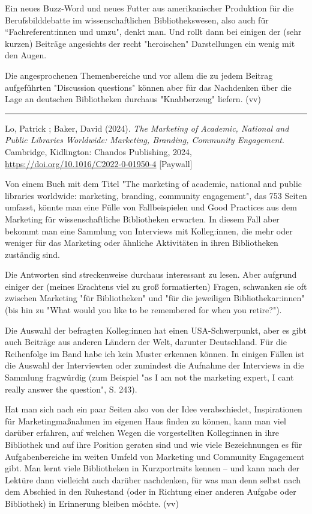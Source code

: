 \documentclass[a4paper,
fontsize=11pt,
oneside,
numbers=noperiodatend,
parskip=half-,
bibliography=totoc,
final
]{scrartcl}
\begin{document}
Ein neues Buzz-Word und neues Futter aus amerikanischer Produktion für
die Berufsbilddebatte im wissenschaftlichen Bibliothekswesen, also auch
für ``Fachreferent:innen und umzu", denkt man. Und rollt dann bei
einigen der (sehr kurzen) Beiträge angesichts der recht "heroischen"
Darstellungen ein wenig mit den Augen.

Die angesprochenen Themenbereiche und vor allem die zu jedem Beitrag
aufgeführten "Discussion questions" können aber für das Nachdenken über
die Lage an deutschen Bibliotheken durchaus "Knabberzeug" liefern. (vv)

\begin{center}\rule{0.5\linewidth}{0.5pt}\end{center}

Lo, Patrick ; Baker, David (2024). \emph{The Marketing of Academic,
National and Public Libraries Worldwide: Marketing, Branding, Community
Engagement}. Cambridge, Kidlington: Chandos Publishing, 2024,
\url{https://doi.org/10.1016/C2022-0-01950-4} {[}Paywall{]}

Von einem Buch mit dem Titel "The marketing of academic, national and
public libraries worldwide: marketing, branding, community engagement",
das 753 Seiten umfasst, könnte man eine Fülle von Fallbeispielen und
Good Practices aus dem Marketing für wissenschaftliche Bibliotheken
erwarten. In diesem Fall aber bekommt man eine Sammlung von Interviews
mit Kolleg:innen, die mehr oder weniger für das Marketing oder ähnliche
Aktivitäten in ihren Bibliotheken zuständig sind.

Die Antworten sind streckenweise durchaus interessant zu lesen. Aber
aufgrund einiger der (meines Erachtens viel zu groß formatierten)
Fragen, schwanken sie oft zwischen Marketing "für Bibliotheken" und "für
die jeweiligen Bibliothekar:innen" (bis hin zu "What would you like to
be remembered for when you retire?").

Die Auswahl der befragten Kolleg:innen hat einen USA-Schwerpunkt, aber
es gibt auch Beiträge aus anderen Ländern der Welt, darunter
Deutschland. Für die Reihenfolge im Band habe ich kein Muster erkennen
können. In einigen Fällen ist die Auswahl der Interviewten oder
zumindest die Aufnahme der Interviews in die Sammlung fragwürdig (zum
Beispiel "as I am not the marketing expert, I can\textquotesingle t
really answer the question", S. 243).

Hat man sich nach ein paar Seiten also von der Idee verabschiedet,
Inspirationen für Marketingmaßnahmen im eigenen Haus finden zu können,
kann man viel darüber erfahren, auf welchen Wegen die vorgestellten
Kolleg:innen in ihre Bibliothek und auf ihre Position geraten sind und
wie viele Bezeichnungen es für Aufgabenbereiche im weiten Umfeld von
Marketing und Community Engagement gibt. Man lernt viele Bibliotheken in
Kurzportraits kennen -- und kann nach der Lektüre dann vielleicht auch
darüber nachdenken, für was man denn selbst nach dem Abschied in den
Ruhestand (oder in Richtung einer anderen Aufgabe oder Bibliothek) in
Erinnerung bleiben möchte. (vv)
\end{document}
